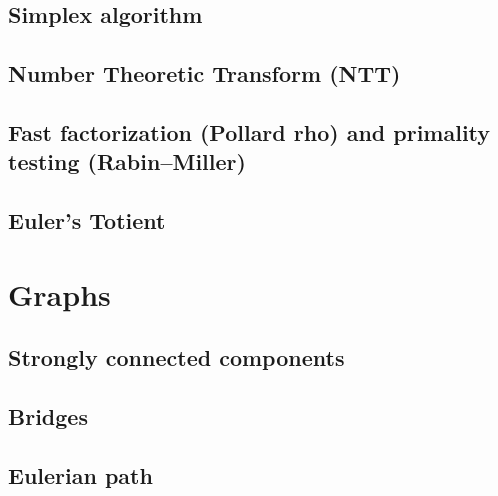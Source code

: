 \documentclass[9pt]{extarticle}
\begin{document}
\begin{multicols*}{3}
\subsection{Simplex algorithm} %


\pagebreak

\subsection{Number Theoretic Transform (NTT)}


\subsection{Fast factorization (Pollard rho) and primality testing
(Rabin--Miller)} %


\subsection{Euler's Totient} %


\section{Graphs}

\subsection{Strongly connected components} %


\subsection{Bridges} %


\subsection{Eulerian path} %



\end{multicols*}
\end{document}

